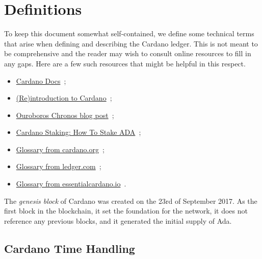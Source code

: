 \section{Definitions}
\label{sec:definitions}
To keep this document somewhat self-contained, we define some technical terms that
arise when defining and describing the Cardano ledger.
This is not meant to be comprehensive and the reader may wish to consult
online resources to fill in any gaps.  Here are a few such resources that might be
helpful in this respect.

\begin{itemize}
  \item
        \href{https://docs.cardano.org/}%
             {Cardano Docs}~\cite{www-docs-cardano};
  \item
        \href{https://developers.cardano.org/docs/operate-a-stake-pool/introduction-to-cardano/}%
             {(Re)introduction to Cardano}~\cite{www-developers-cardano-reintro};
  \item
        \href{https://iohk.io/en/blog/posts/2021/10/27/ouroboros-chronos-provides-the-first-high-resilience-cryptographic-time-source-based-on-blockchain/}%
             {Ouroboros Chronos blog post}~\cite{www-iohk-blog-ouroboros};
  \item
        \href{https://www.ledger.com/academy/cardano-staking-how-to-stake-ada}%
             {Cardano Staking: How To Stake ADA}~\cite{www-ledger-academy-stake-ada};
  \item
        \href{https://cardano.org/docs/glossary#cardano-glossary}%
             {Glossary from cardano.org}~\cite{www-cardano-glossary};
  \item
        \href{https://www.ledger.com/academy/glossary}%
             {Glossary from ledger.com}~\cite{www-ledger-academy-glossary};
  \item
        \href{https://www.essentialcardano.io/glossary?sort=alphabetical}%
             {Glossary from essentialcardano.io}~\cite{www-essential-cardano-glossary}.
\end{itemize}

\begin{definition}
\label{def:genesis}
The \emph{genesis block} of Cardano was created on the 23rd of September 2017. As the
first block in the blockchain, it set the foundation for the network, it does not reference any previous
blocks, and it generated the initial supply of Ada.
\end{definition}

\subsection{Cardano Time Handling}
\label{sec:cardano-time-handling}


